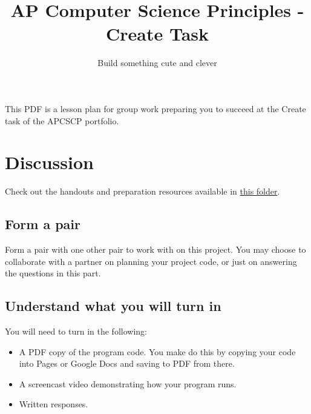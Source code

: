 \documentclass{42-en}
\begin{document}
\title{AP Computer Science Principles - Create Task}
\subtitle{Build something cute and clever}


\summary
{
This PDF is a lesson plan for group work preparing you to succeed at the Create task of the APCSCP portfolio.
}

\maketitle

\tableofcontents


\chapter{Discussion}

Check out the handouts and preparation resources available in \href{https://drive.google.com/drive/folders/1lHIS-9qzAWCZyexNDr3rtBcgj4lM-jgo?usp=sharing}{this folder}.

\section{Form a pair}

Form a pair with one other pair to work with on this project. You may choose to collaborate with a partner on planning your project code, or just on answering the questions in this part.

\section{Understand what you will turn in}

You will need to turn in the following:
\begin{itemize}
	\item A PDF copy of the program code. You make do this by copying your code into Pages or Google Docs and saving to PDF from there.
	\item A screencast video demonstrating how your program runs.
	\item Written responses.
\end{itemize}
\end{document}
